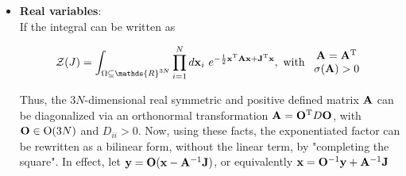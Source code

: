 \begin{itemize}
    \item \textbf{Real variables}: \\
    
    If the integral can be written as 
    
    \begin{equation}
        \mathcal{Z}(J) = \int_{\Omega \subseteq \mathds{R}^{3N}} \prod_{i=1}^{N} d{{\bf x}}_i \blanky e^{-\frac{1}{2} {{\bf x}}^{\textnormal{T}} {{\bf A}} {{\bf x}} + {{\bf J}}^{\textnormal{T}} {{\bf x}}}, \textnormal{ with } \begin{array}{c}
            {{\bf A}} = {{\bf A}}^{\textnormal{T}} \\
            \sigma({{\bf A}}) > 0 
        \end{array}
    \end{equation}

Thus, the $3N$-dimensional real symmetric and positive defined matrix ${{{\bf A}}}$ can be diagonalized via an orthonormal transformation ${{\bf A}} = {{\bf O}}^{\textnormal{T}} D  {{\bf O}}$, with $ {{\bf O}} \in \textnormal{O}(3N)$ and $D_{ii} > 0$. Now, using these facts, the exponentiated factor can be rewritten as a bilinear form, without the linear term, by "completing the square". In effect, let ${{\bf y}} = {{\bf O} ({\bf x} - {\bf A}^{-1} {\bf J})}$, or equivalently ${\bf x} = {\bf O}^{-1} {\bf y} + {\bf A}^{-1} {\bf J}$


\end{itemize}
